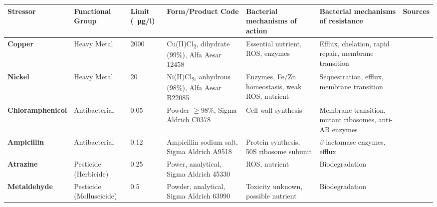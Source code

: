 \documentclass[10pt]{article}
\begin{document}
\begin{landscape}
\begin{table}[h]
\begin{threeparttable}
\small
\setlength{\tabcolsep}{4pt}
\setlength{\extrarowheight}{3pt}
\begin{tabular}{l M l K K K c}
\toprule
\textbf{Stressor} & \textbf{Functional Group} & \textbf{Limit (\SI{}{\ug}/l}) & \textbf{Form/Product Code} & \textbf{Bacterial mechanisms of action} & \textbf{Bacterial mechanisms of resistance} & \textbf{Sources} \\
\midrule
{}   \textbf{Copper} & Heavy Metal & 2000 & Cu(II)Cl\textsubscript{2}, dihydrate (99\%),                      Alfa Aesar 12458 & Essential nutrient, ROS, enzymes & Efflux, chelation, rapid repair,                            membrane transition & \cite{Nayar2004EnvironmentalMesocosms,Valko2005,Dupont2011,ECHA2018Cu} \\
                    \textbf{Nickel} & Heavy Metal & 20 & Ni(II)Cl\textsubscript{2}, anhydrous (98\%), Alfa Aesar B22085 & Enzymes, Fe/Zn homeostasis, weak ROS, nutrient & Sequestration, efflux, membrane transition & \cite{Nayar2004EnvironmentalMesocosms,Macomber2011,Nishimura1998,Zamble2015} \\

   \textbf{Chloramphenicol} & Antibacterial & 0.05 & Powder $\geqslant$98\%, Sigma                          Aldrich C0378 & Cell wall synthesis & Membrane transition, mutant ribosomes, anti-AB enzymes &                     \cite{Shaw1979,Rebstock1949,Toku-E2018Ch,Ruiz1999MechanismsFish} \\

                    \textbf{Ampicillin} & Antibacterial & 0.12 & Ampicillin sodium salt, Sigma Aldrich A9518 & Protein synthesis, 50S ribosome subunit & $\beta$-lactamase enzymes, efflux & \cite{Ruiz1999MechanismsFish,Costanzo2005} \\

   \textbf{Atrazine} & Pesticide (Herbicide) & 0.25 & Power, analytical, Sigma Aldrich                      45330 & ROS, nutrient & Biodegradation &                                                                          \cite{Shimabukuro1969,Delorenzo2001,Zhang2012} \\

                    \textbf{Metaldehyde} & Pesticide \break (Molluscicide) & 0.5 & Powder, analytical, Sigma Aldrich 63990 & Toxicity unknown, possible nutrient & Biodegradation & \cite{Kay2014,Castle2017,Thomas2017} \\


\end{tabular}
\end{threeparttable}
\end{table}
\end{landscape}
\end{document}
